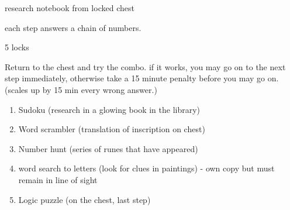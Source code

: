 \documentclass[green]{NeptuneBall}
\begin{document}
\name{\gGlowShell{}}

research notebook from locked chest

each step answers a chain of numbers.

5 locks

Return to the chest and try the combo. if it works, you may go on to the next step immediately, otherwise take a 15 minute penalty before you may go on. (scales up by 15 min every wrong answer.)

\begin{enumerate}
\item Sudoku  (research in a glowing book in the library)
\item Word scrambler  (translation of inscription on chest)
\item Number hunt  (series of runes that have appeared) 
\item word search to letters  (look for clues in paintings) - own copy but must remain in line of sight
\item Logic puzzle  (on the chest, last step)
\end{enumerate}
\end{document}
